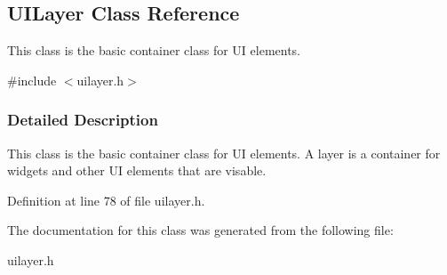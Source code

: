 \hypertarget{classUILayer}{
\subsection{UILayer Class Reference}
\label{db/db2/classUILayer}
}


This class is the basic container class for UI elements.  




{\ttfamily \#include $<$uilayer.h$>$}



\subsubsection{Detailed Description}
This class is the basic container class for UI elements. A layer is a container for widgets and other UI elements that are visable. 

Definition at line 78 of file uilayer.h.



The documentation for this class was generated from the following file:\begin{DoxyCompactItemize}
\item 
uilayer.h\end{DoxyCompactItemize}
